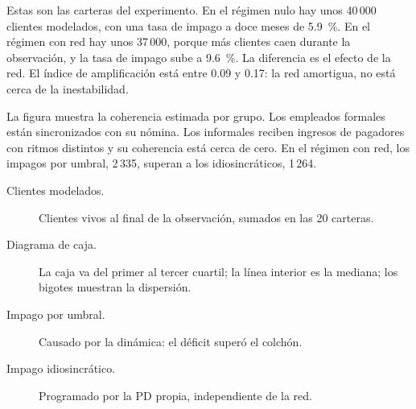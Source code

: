 \begin{decir}
Estas son las carteras del experimento. En el régimen nulo hay unos 40\,000 clientes
modelados, con una tasa de impago a doce meses de 5.9~\%. En el régimen con red hay unos
37\,000, porque más clientes caen durante la observación, y la tasa de impago sube a
9.6~\%. La diferencia es el efecto de la red. El índice de amplificación está entre 0.09
y 0.17: la red amortigua, no está cerca de la inestabilidad.

La figura muestra la coherencia estimada por grupo. Los empleados formales están
sincronizados con su nómina. Los informales reciben ingresos de pagadores con ritmos
distintos y su coherencia está cerca de cero. En el régimen con red, los impagos por
umbral, 2\,335, superan a los idiosincráticos, 1\,264.
\end{decir}
\begin{terminos}
\begin{description}
\item[Clientes modelados.] Clientes vivos al final de la observación, sumados en las 20
carteras.
\item[Diagrama de caja.] La caja va del primer al tercer cuartil; la línea interior es la
mediana; los bigotes muestran la dispersión.
\item[Impago por umbral.] Causado por la dinámica: el déficit superó el colchón.
\item[Impago idiosincrático.] Programado por la PD propia, independiente de la red.
\end{description}
\end{terminos}


